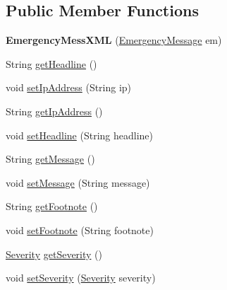 \subsection*{Public Member Functions}
\begin{DoxyCompactItemize}
\item 
\hypertarget{classgov_1_1fnal_1_1ppd_1_1dd_1_1xml_1_1messages_1_1EmergencyMessXML_a0e973d15ae1519cd7a4f9e6a858b8da5}{{\bfseries Emergency\-Mess\-X\-M\-L} (\hyperlink{classgov_1_1fnal_1_1ppd_1_1dd_1_1emergency_1_1EmergencyMessage}{Emergency\-Message} em)}\label{classgov_1_1fnal_1_1ppd_1_1dd_1_1xml_1_1messages_1_1EmergencyMessXML_a0e973d15ae1519cd7a4f9e6a858b8da5}

\item 
String \hyperlink{classgov_1_1fnal_1_1ppd_1_1dd_1_1xml_1_1messages_1_1EmergencyMessXML_a81e911981a92582d49e540e721b589a6}{get\-Headline} ()
\item 
void \hyperlink{classgov_1_1fnal_1_1ppd_1_1dd_1_1xml_1_1messages_1_1EmergencyMessXML_a76ce0f2fdf4b42995124c48a9d349063}{set\-Ip\-Address} (String ip)
\item 
String \hyperlink{classgov_1_1fnal_1_1ppd_1_1dd_1_1xml_1_1messages_1_1EmergencyMessXML_ab227d15c4f55af8c4cb275b38052e1df}{get\-Ip\-Address} ()
\item 
void \hyperlink{classgov_1_1fnal_1_1ppd_1_1dd_1_1xml_1_1messages_1_1EmergencyMessXML_a517ddd206a614ce1596d00127edb9dd4}{set\-Headline} (String headline)
\item 
String \hyperlink{classgov_1_1fnal_1_1ppd_1_1dd_1_1xml_1_1messages_1_1EmergencyMessXML_a46acaf949ecf0c6786089013328f9bc1}{get\-Message} ()
\item 
void \hyperlink{classgov_1_1fnal_1_1ppd_1_1dd_1_1xml_1_1messages_1_1EmergencyMessXML_a5b2125569d1b6fd71ed06c50044d796b}{set\-Message} (String message)
\item 
String \hyperlink{classgov_1_1fnal_1_1ppd_1_1dd_1_1xml_1_1messages_1_1EmergencyMessXML_afb16b32b48db4348fb91131572421545}{get\-Footnote} ()
\item 
void \hyperlink{classgov_1_1fnal_1_1ppd_1_1dd_1_1xml_1_1messages_1_1EmergencyMessXML_ac744b2fc50cffd90c7de36b465bcb4d0}{set\-Footnote} (String footnote)
\item 
\hyperlink{enumgov_1_1fnal_1_1ppd_1_1dd_1_1emergency_1_1Severity}{Severity} \hyperlink{classgov_1_1fnal_1_1ppd_1_1dd_1_1xml_1_1messages_1_1EmergencyMessXML_a8acef72d19d2eddf96b0afe6d0ca459e}{get\-Severity} ()
\item 
void \hyperlink{classgov_1_1fnal_1_1ppd_1_1dd_1_1xml_1_1messages_1_1EmergencyMessXML_a027b03e524d5c09508051afa8cb2112f}{set\-Severity} (\hyperlink{enumgov_1_1fnal_1_1ppd_1_1dd_1_1emergency_1_1Severity}{Severity} severity)

\end{DoxyCompactItemize}
